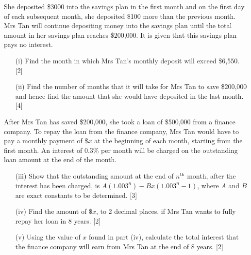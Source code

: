 \documentclass[twoside,english]{article}
\begin{document}
\begin{enumerate}
She deposited \$3000 into the savings plan in the first month and
on the first day of each subsequent month, she deposited \$100 more
than the previous month. Mrs Tan will continue depositing money into
the savings plan until the total amount in her savings plan reaches
\$200,000. It is given that this savings plan pays no interest. 
\begin{enumerate}
\item[(i)]  Find the month in which Mrs Tan\textquoteright s monthly deposit
will exceed \$6,550.\hfill{} {[}2{]}
\item[(ii)]  Find the number of months that it will take for Mrs Tan to save
\$200,000 and hence find the amount that she would have deposited
in the last month.\hfill{} {[}4{]}
\end{enumerate}
After Mrs Tan has saved \$200,000, she took a loan of \$500,000 from
a finance company. To repay the loan from the finance company, Mrs
Tan would have to pay a monthly payment of $\$x$ at the beginning
of each month, starting from the first month. An interest of 0.3\%
per month will be charged on the outstanding loan amount at the end
of the month. 
\begin{enumerate}
\item[(iii)]  Show that the outstanding amount at the end of $n^{\text{th}}$
month, after the interest has been charged, is $A\left(1.003^{n}\right)-Bx\left(1.003^{n}-1\right)$,
where $A$ and $B$ are exact constants to be determined. \hfill{}{[}3{]}
\item[(iv)]  Find the amount of $\$x$, to 2 decimal places, if Mrs Tan wants
to fully repay her loan in 8 years. \hfill{}{[}2{]}
\item[(v)]  Using the value of $x$ found in part (iv), calculate the total
interest that the finance company will earn from Mrs Tan at the end
of 8 years.\hfill{} {[}2{]}
\end{enumerate}
\end{enumerate}
\end{document}

